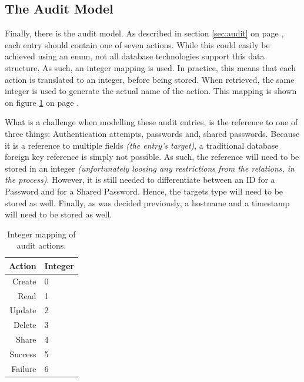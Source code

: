 		\subsection{The Audit Model}
			\label{sec:moddeling:audit}
			Finally, there is the audit model. As described in section \ref{sec:audit} on page \pageref{sec:audit}, each entry should contain one of seven actions. While this could easily be achieved using an enum, not all database technologies support this data structure. As such, an integer mapping is used. In practice, this means that each action is translated to an integer, before being stored. When retrieved, the same integer is used to generate the actual name of the action. This mapping is shown on figure \ref{table:audit:actionmapping} on page \pageref{table:audit:actionmapping}.

			What is a challenge when modelling these audit entries, is the reference to one of three things: Authentication attempts, passwords and, shared passwords. Because it is a reference to multiple fields \emph{(the entry's target)}, a traditional database foreign key reference is simply not possible. As such, the reference will need to be stored in an integer \emph{(unfortunately loosing any restrictions from the relations, in the process)}. However, it is still needed to differentiate between an ID for a Password and for a Shared Password. Hence, the targets type will need to be stored as well. Finally, as was decided previously, a hostname and a timestamp will need to be stored as well.

			\begin{table}[h!]
				\centering
				\begin{tabular}{r | l}
					\textbf{Action} 	& \textbf{Integer} 	\\
					\hline
					Create 				& 0 				\\
					Read 				& 1 				\\
					Update 				& 2 				\\
					Delete 				& 3 				\\
					Share 				& 4 				\\
					Success 			& 5 				\\
					Failure 			& 6 				\\					
				\end{tabular}
				\caption{Integer mapping of audit actions.}
				\label{table:audit:actionmapping}
			\end{table}

